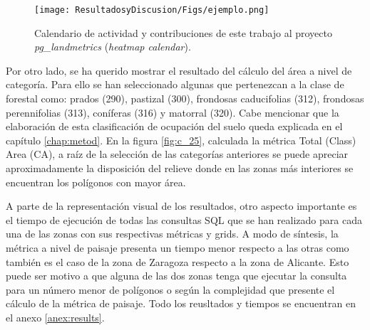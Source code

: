\begin{figure}
\begin{center}
\texttt{[image: ResultadosyDiscusion/Figs/ejemplo.png]}
\caption{Calendario de actividad y contribuciones de este trabajo al proyecto \textit{pg\_landmetrics} (\textit{heatmap calendar}). \label{fig:ejemplo}}
\end{center}
\end{figure}

Por otro lado, se ha querido mostrar el resultado del cálculo del área a nivel de categoría. Para ello se han seleccionado algunas que pertenezcan a la clase de forestal como: prados (290), pastizal (300), frondosas caducifolias (312), frondosas perennifolias (313), coníferas (316) y matorral (320). Cabe mencionar que la elaboración de esta clasificación de ocupación del suelo queda explicada en el capítulo \ref{chap:metod}. En la figura \ref{fig:c_25}, calculada la métrica Total (Class) Area (CA), a raíz de la selección de las categorías anteriores se puede apreciar aproximadamente la disposición del relieve donde en las zonas más interiores se encuentran los polígonos con mayor área.

A parte de la representación visual de los resultados, otro aspecto importante es el tiempo de ejecución de todas las consultas SQL que se han realizado para cada una de las zonas con sus respectivas métricas y grids. A modo de síntesis, la métrica a nivel de paisaje presenta un tiempo menor respecto a las otras como también es el caso de la zona de Zaragoza respecto a la zona de Alicante. Esto puede ser motivo a que alguna de las dos zonas tenga que ejecutar la consulta para un número menor de polígonos o según la complejidad que presente el cálculo de la métrica de paisaje. Todo los reusltados y tiempos se encuentran en el anexo \ref{anex:results}.



